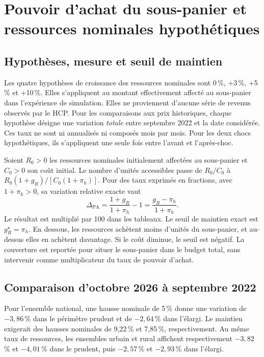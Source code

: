 \section{Pouvoir d'achat du sous-panier et ressources nominales hypothétiques}
\label{sec:pouvoir-achat}
\subsection{Hypothèses, mesure et seuil de maintien}

Les quatre hypothèses de croissance des ressources nominales sont 0\,\%, +3\,\%, +5\,\% et +10\,\%. Elles s'appliquent au montant effectivement affecté au sous-panier dans l'expérience de simulation. Elles ne proviennent d'aucune série de revenus observés par le HCP. Pour les comparaisons aux prix historiques, chaque hypothèse désigne une variation \emph{totale} entre septembre 2022 et la date considérée. Ces taux ne sont ni annualisés ni composés mois par mois. Pour les deux chocs hypothétiques, ils s'appliquent une seule fois entre l'avant et l'après-choc.

Soient $R_0>0$ les ressources nominales initialement affectées au sous-panier et $C_0>0$ son coût initial. Le nombre d'unités accessibles passe de $R_0/C_0$ à $R_0(1+g_R)/[C_0(1+\pi_h)]$. Pour des taux exprimés en fractions, avec $1+\pi_h>0$, sa variation relative exacte vaut
\begin{equation}
 \Delta_{\mathrm{PA}}
 = \frac{1+g_R}{1+\pi_h}-1
 = \frac{g_R-\pi_h}{1+\pi_h}.
 \label{eq:pouvoir-achat}
\end{equation}
Le résultat est multiplié par 100 dans les tableaux. Le seuil de maintien exact est $g_R^\star=\pi_h$. En dessous, les ressources achètent moins d'unités du sous-panier, et au-dessus elles en achètent davantage. Si le coût diminue, le seuil est négatif. La couverture est reportée pour situer le sous-panier dans le budget total, sans intervenir comme multiplicateur du taux de pouvoir d'achat.

\subsection{Comparaison d'octobre 2026 à septembre 2022}

Pour l'ensemble national, une hausse nominale de 5\,\% donne une variation de $-3{,}86$\,\% dans le périmètre prudent et de $-2{,}64$\,\% dans l'élargi. Le maintien exigerait des hausses nominales de 9,22\,\% et 7,85\,\%, respectivement. Au même taux de ressources, les ensembles urbain et rural affichent respectivement $-3{,}82$\,\% et $-4{,}01$\,\% dans le prudent, puis $-2{,}57$\,\% et $-2{,}93$\,\% dans l'élargi.

